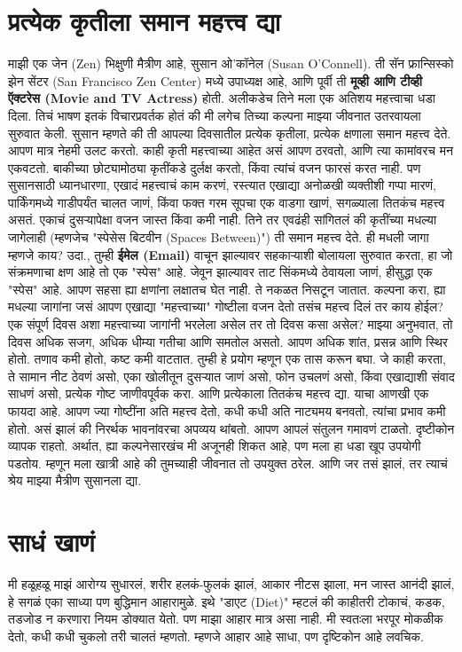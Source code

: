  \chapter{प्रत्येक कृतीला समान महत्त्व द्या}
माझी एक जेन (Zen) भिक्षुणी मैत्रीण आहे, सुसान ओ'कॉनेल (Susan O'Connell). ती सॅन फ्रान्सिस्को झेन सेंटर (San Francisco Zen Center) मध्ये उपाध्यक्ष आहे, आणि पूर्वी ती \textbf{मूव्ही आणि टीव्ही ऍक्टरेस (Movie and TV Actress)} होती. अलीकडेच तिने मला एक अतिशय महत्त्वाचा धडा दिला. तिचं भाषण इतकं विचारप्रवर्तक होतं की मी लगेच तिच्या कल्पना माझ्या जीवनात उतरवायला सुरुवात केली.
सुसान म्हणते की ती आपल्या दिवसातील प्रत्येक कृतीला, प्रत्येक क्षणाला समान महत्त्व देते. आपण मात्र नेहमी उलट करतो. काही कृती महत्त्वाच्या आहेत असं आपण ठरवतो, आणि त्या कामांवरच मन एकवटतो.
 बाकीच्या छोट्यामोठ्या कृतींकडे दुर्लक्ष करतो, किंवा त्यांचं वजन फारसं करत नाही.
पण सुसानसाठी ध्यानधारणा, एखादं महत्त्वाचं काम करणं, रस्त्यात एखाद्या अनोळखी व्यक्तीशी गप्पा मारणं,
 पार्किंगमध्ये गाडीपर्यंत चालत जाणं, किंवा फक्त गरम सूपचा एक वाडगा खाणं,  सगळ्याला तितकंच महत्त्व असतं.
 एकाचं दुसऱ्यापेक्षा वजन जास्त किंवा कमी नाही. तिने तर एवढंही सांगितलं की कृतींच्या मधल्या जागेलाही
 (म्हणजेच "स्पेसेस बिटवीन (Spaces Between)") ती समान महत्त्व देते.
ही मधली जागा म्हणजे काय? उदा., तुम्ही \textbf{ईमेल (Email)} वाचून झाल्यावर सहकाऱ्याशी बोलायला सुरुवात करता,  हा जो संक्रमणाचा क्षण आहे तो एक "स्पेस" आहे. जेवून झाल्यावर ताट सिंकमध्ये ठेवायला जाणं, हीसुद्धा एक "स्पेस" आहे. आपण सहसा ह्या क्षणांना लक्षातच घेत नाही. ते नकळत निसटून जातात.
कल्पना करा, ह्या मधल्या जागांना जसं आपण एखाद्या "महत्त्वाच्या" गोष्टीला वजन देतो तसंच महत्त्व दिलं तर काय होईल? एक संपूर्ण दिवस अशा महत्त्वाच्या जागांनी भरलेला असेल तर तो दिवस कसा असेल? माझ्या अनुभवात, तो दिवस अधिक सजग, अधिक धीम्या गतीचा आणि समतोल असतो. आपण अधिक शांत, प्रसन्न आणि स्थिर होतो. तणाव कमी होतो, कष्ट कमी वाटतात.
तुम्ही हे प्रयोग म्हणून एक तास करून बघा. जे काही करता, ते सामान नीट ठेवणं असो, एका खोलीतून दुसऱ्यात जाणं असो, फोन उचलणं असो, किंवा एखाद्याशी संवाद साधणं असो,  प्रत्येक गोष्ट जाणीवपूर्वक करा. आणि प्रत्येकाला तितकंच महत्त्व द्या.
याचा आणखी एक फायदा आहे. आपण ज्या गोष्टींना अति महत्त्व देतो, कधी कधी अति नाट्यमय बनवतो, त्यांचा प्रभाव कमी होतो.
 असं झालं की निरर्थक भावनांवरचा अपव्यय थांबतो. आपण आपलं संतुलन गमावणं टाळतो. दृष्टीकोन व्यापक राहतो.
अर्थात, ह्या कल्पनेसारखंच मी अजूनही शिकत आहे, पण मला हा धडा खूप उपयोगी पडतोय. म्हणून मला खात्री आहे की तुमच्याही जीवनात तो उपयुक्त ठरेल. आणि जर तसं झालं, तर त्याचं श्रेय माझ्या मैत्रीण सुसानला द्या.

 \chapter{साधं खाणं}
मी हळूहळू माझं आरोग्य सुधारलं, शरीर हलकं-फुलकं झालं, आकार नीटस झाला, मन जास्त आनंदी झालं, 
 हे सगळं एका साध्या पण बुद्धिमान आहारामुळे. इथे "डाएट (Diet)" म्हटलं की काहीतरी टोकाचं, कडक,
 तडजोड न करणारा नियम डोक्यात येतो. पण माझा आहार मात्र असा नाही. मी स्वतःला भरपूर मोकळीक देतो,
 कधी कधी चुकलो तरी चालतं म्हणतो. म्हणजे आहार आहे साधा, पण दृष्टिकोन आहे लवचिक.
